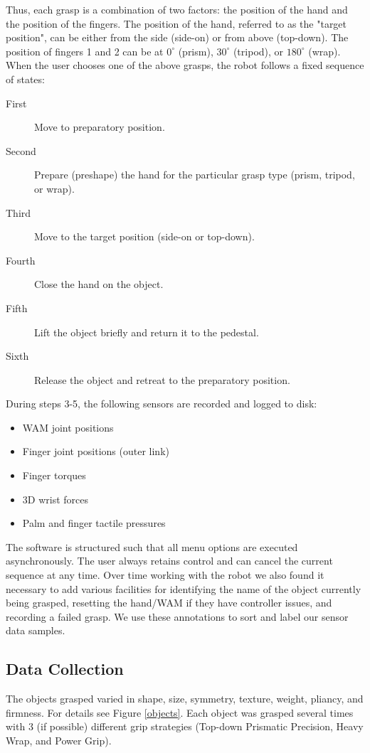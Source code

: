 Thus, each grasp is a combination of two factors: the position of the hand and the position of the fingers. The position of the hand, referred to as the "target position", can be either from the side (side-on) or from above (top-down). The position of fingers 1 and 2 can be at $0^\circ$ (prism), $30^\circ$ (tripod), or $180^\circ$ (wrap). When the user chooses one of the above grasps, the robot follows a fixed sequence of states:\\
\begin{description}
\item[First] Move to preparatory position.
\item[Second]  Prepare (preshape) the hand for the particular grasp type (prism, tripod, or wrap).
\item[Third]  Move to the target position (side-on or top-down).
\item[Fourth]  Close the hand on the object.
\item[Fifth]  Lift the object briefly and return it to the pedestal.
\item[Sixth]  Release the object and retreat to the preparatory position.
\end{description}

During steps 3-5, the following sensors are recorded and logged to disk:
\begin{itemize}
\item WAM joint positions
\item Finger joint positions (outer link)
\item Finger torques
\item 3D wrist forces
\item Palm and finger tactile pressures
\end{itemize}

The software is structured such that all menu options are executed asynchronously. The user always retains control and can cancel the current sequence at any time. Over time working with the robot we also found it necessary to add various facilities for identifying the name of the object currently being grasped, resetting the hand/WAM if they have controller issues, and recording a failed grasp. We use these annotations to sort and label our sensor data samples.

\subsection*{Data Collection}
The objects grasped varied in shape, size, symmetry, texture, weight, pliancy, and firmness. For details see Figure \ref{objects}. Each object was grasped several times with 3 (if possible) different grip strategies (Top-down Prismatic Precision, Heavy Wrap, and Power Grip). 

